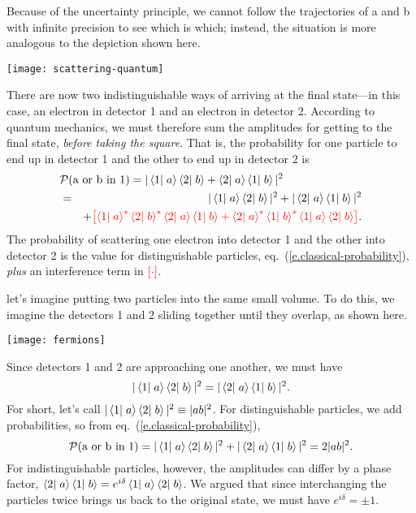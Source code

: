 \begin{sidebar}
Because of the uncertainty principle, we cannot follow the trajectories of a and b with infinite precision to see which is which; instead, the situation is more analogous to the depiction shown here.
\begin{center}
\texttt{[image: scattering-quantum]}
\end{center}
There are now two indistinguishable ways of arriving at the final state---in this case, an electron in detector 1 and an electron in detector 2. According to quantum mechanics, we must therefore sum the amplitudes for getting to the final state, \emph{before taking the square}. That is, the probability for one particle to end up in detector 1 and the other to end up in detector 2 is
\begin{eqnarray}
    \lefteqn{\mathcal{P}(\textrm{a or b in 1}) = |\braket{1}{a}\braket{2}{b} + \braket{2}{a}\braket{1}{b}|^2} && \label{e.scattering-quantum}\\
    &=& |\braket{1}{a}\braket{2}{b}|^2 + |\braket{2}{a}\braket{1}{b}|^2 \nonumber\\
    && + {\color{red}\left[ \braket{1}{a}^*\braket{2}{b}^*\braket{2}{a}\braket{1}{b} + \braket{2}{a}^*\braket{1}{b}^*\braket{1}{a}\braket{2}{b}\right]}. \nonumber
\end{eqnarray}
The probability of scattering one electron into detector 1 and the other into detector 2 is the  value for distinguishable particles, eq.~(\ref{e.classical-probability}), \emph{plus} an interference term in $\color{red}[\cdot]$.

 let's imagine putting two particles into the same small volume.  To do this, we imagine the detectors 1 and 2 sliding together until they overlap, as shown here.  
\begin{center}
\texttt{[image: fermions]}
\end{center}
Since detectors 1 and 2 are approaching one another, we must have
\begin{equation}
    |\left\langle1\right|\left.a\right\rangle\left\langle2\right|\left.b\right\rangle|^2 = |\left\langle2\right|\left.a\right\rangle\left\langle1\right|\left.b\right\rangle|^2.
\end{equation}
For short, let's call $|\left\langle1\right|\left.a\right\rangle\left\langle2\right|\left.b\right\rangle|^{2}\equiv |ab|^{2}$.
For distinguishable particles, we add probabilities, so from eq.~(\ref{e.classical-probability}),
\[    \mathcal{P}(\textrm{a or b in 1}) = |\left\langle1\right|\left.a\right\rangle\left\langle2\right|\left.b\right\rangle|^2 + |\left\langle2\right|\left.a\right\rangle\left\langle1\right|\left.b\right\rangle|^2 = 2|ab|^{2}. \]
For indistinguishable particles, however, the amplitudes can differ by a phase factor, $\left\langle2\right|\left.a\right\rangle\left\langle1\right|\left.b\right\rangle = e^{i\delta}\left\langle1\right|\left.a\right\rangle\left\langle2\right|\left.b\right\rangle$. We argued that since interchanging the particles twice brings us back to the original state, we must have $e^{i\delta} = \pm 1$.


\end{sidebar}
